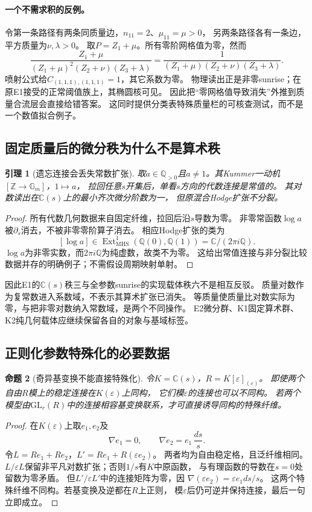 \documentclass[11pt,a4paper]{ctexart}
\theoremstyle{cnplain}\newtheorem{theorem}{定理}[section]
\newtheorem{proposition}[theorem]{命题}
\newtheorem{lemma}[theorem]{引理}
\theoremstyle{definition}\newtheorem{definition}[theorem]{定义}
\theoremstyle{remark}\newtheorem{remark}[theorem]{注}
\newcommand{\Q}{\mathbb Q}\newcommand{\cC}{\mathcal C}
\begin{document}
\paragraph{一个不需求积的反例。}
令第一条路径有两条同质量边，$n_{11}=2$、$\mu_{11}=\mu>0$，
另两条路径各有一条边，平方质量为$\nu,\lambda>0$。
取$P=Z_1+\mu$。所有零阶网格值为零，然而
\[
 \frac{Z_1+\mu}{(Z_1+\mu)^2(Z_2+\nu)(Z_3+\lambda)}
 =\frac1{(Z_1+\mu)(Z_2+\nu)(Z_3+\lambda)}.
\]
喷射公式给$C_{(1,1,1),(1,1,1)}=1$，其它系数为零。
物理读出正是非零sunrise；在原E1接受的正常阈值族上，其椭圆核可见。
因此把“零网格值导致消失”外推到质量合流层会直接给错答案。
这同时提供分类表特殊质量栏的可核查测试，而不是一个数值拟合例子。

\subsection{固定质量后的微分秩为什么不是算术秩}
\begin{lemma}[遗忘连接会丢失常数扩张]\label{lem:constantkummerloss}
取$a\in\Q_{>0}$且$a\ne1$。其Kummer一动机$[\mathbb Z\to\mathbb G_m]$，$1\mapsto a$，
拉回任意$s$开集后，单看$s$方向的代数连接是常值的。
其对数读出在$\mathbb C(s)$上的最小齐次微分阶数为一，
但原混合Hodge扩张不分裂。
\end{lemma}
\begin{proof}
所有代数几何数据来自固定纤维，拉回后沿$s$导数为零。
非零常函数$\log a$被$\partial_s$消去，不被非零零阶算子消去。
相应Hodge扩张的类为
\[
 [\log a]\in\operatorname{Ext}^1_{\mathrm{MHS}}(\Q(0),\Q(1))
       =\mathbb C/(2\pi i\Q).
\]
$\log a$为非零实数，而$2\pi i\Q$为纯虚数，故类不为零。
这给出常值连接与非分裂比较数据并存的明确例子；不需假设周期映射单射。
\end{proof}

因此E1的$\mathbb C(s)$秩三与全参数sunrise的实现载体秩六不是相互反驳。
质量对数作为复常数进入系数域，不表示其算术扩张已消失。
等质量使质量比对数实际为零，与把非零对数纳入常数域，是两个不同操作。
E2微分群、K1固定算术群、K2纯几何载体应继续保留各自的对象与基域标签。

\subsection{正则化参数特殊化的必要数据}
\begin{proposition}[奇异基变换不能直接特殊化]\label{prop:epsilonlattice}
令$K=\mathbb C(s)$，$R=K[\varepsilon]_{(\varepsilon)}$。
即使两个自由$R$模上的稳定连接在$K(\varepsilon)$上同构，
它们模$\varepsilon$的连接也可以不同构。
若两个模型由$\mathrm{GL}_r(R)$中的连接相容基变换联系，才可直接诱导同构的特殊纤维。
\end{proposition}
\begin{proof}
在$K(\varepsilon)$上取$e_1,e_2$及
\[
 \nabla e_1=0,\qquad \nabla e_2=e_1\,\frac{ds}{s}.
\]
令$L=Re_1+Re_2$，$L'=Re_1+R(\varepsilon e_2)$。
两者均为自由稳定格，且泛纤维相同。
$L/\varepsilon L$保留非平凡对数扩张；否则$1/s$有$K$中原函数，
与有理函数的导数在$s=0$处留数为零矛盾。
但$L'/\varepsilon L'$中的连接矩阵为零，因
$\nabla(\varepsilon e_2)=\varepsilon e_1 ds/s$。
这两个特殊纤维不同构。若基变换及逆都在$R$上正则，
模$\varepsilon$后仍可逆并保持连接，最后一句立即成立。
\end{proof}
\end{document}
